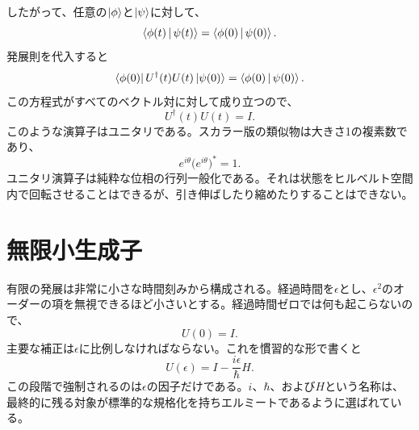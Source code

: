 したがって、任意の\(\left\lvert\phi\right\rangle\)と\(\left\lvert\psi\right\rangle\)に対して、
\begin{equation}
\left\langle\phi(t)\,\middle|\,\psi(t)\right\rangle
=
\left\langle\phi(0)\,\middle|\,\psi(0)\right\rangle.
\end{equation}
発展則を代入すると
\begin{equation}
\left\langle\phi(0)\right\rvert U^\dagger(t)U(t)\left\lvert\psi(0)\right\rangle
=
\left\langle\phi(0)\,\middle|\,\psi(0)\right\rangle.
\end{equation}
この方程式がすべてのベクトル対に対して成り立つので、
\begin{equation}
\boxed{U^\dagger(t)U(t)=I}.
\end{equation}
このような演算子はユニタリである。スカラー版の類似物は大きさ1の複素数であり、
\begin{equation}
e^{i\theta}\bigl(e^{i\theta}\bigr)^*=1.
\end{equation}
ユニタリ演算子は純粋な位相の行列一般化である。それは状態をヒルベルト空間内で回転させることはできるが、引き伸ばしたり縮めたりすることはできない。

\section{無限小生成子}

有限の発展は非常に小さな時間刻みから構成される。経過時間を\(\epsilon\)とし、\(\epsilon^2\)のオーダーの項を無視できるほど小さいとする。経過時間ゼロでは何も起こらないので、
\begin{equation}
U(0)=I.
\end{equation}
主要な補正は\(\epsilon\)に比例しなければならない。これを慣習的な形で書くと
\begin{equation}
\boxed{U(\epsilon)=I-\frac{i\epsilon}{\hbar}H}.
\end{equation}
この段階で強制されるのは\(\epsilon\)の因子だけである。\(i\)、\(\hbar\)、および\(H\)という名称は、最終的に残る対象が標準的な規格化を持ちエルミートであるように選ばれている。

\begin{classroomqa}
\end{classroomqa}

